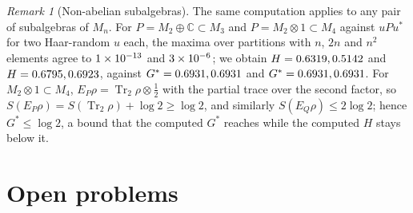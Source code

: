 \documentclass[11pt]{article}
\DeclareMathOperator{\Tr}{Tr}
\newcommand{\C}{\mathbb{C}}
\theoremstyle{plain}
\theoremstyle{definition}
\theoremstyle{remark}
\newtheorem{remark}[theorem]{Remark}
\begin{document}
\begin{remark}[Non-abelian subalgebras]\label{rem:nonab}
The same computation applies to any pair of subalgebras of $M_n$. For $P=M_2\oplus\C\subset M_3$ and $P=M_2\otimes1\subset M_4$
against $uPu^*$ for two Haar-random $u$ each, the maxima over partitions with $n$, $2n$ and $n^2$ elements agree to
$1\times10^{-13}$ and $3\times10^{-6}$; we obtain $H=0.6319, 0.5142$ and $H=0.6795, 0.6923$, against $G^*=0.6931, 0.6931$ and
$G^*=0.6931, 0.6931$. For $M_2\otimes1\subset M_4$, $E_P\rho=\Tr_2\rho\otimes\frac12$ with the partial trace over the second factor, so
$S(E_P\rho)=S(\Tr_2\rho)+\log2\ge\log2$, and similarly $S(E_Q\rho)\le2\log2$; hence $G^*\le\log2$, a bound that the computed $G^*$
reaches while the computed $H$ stays below it.
\end{remark}

\section{Open problems}\label{sec:open}
\end{document}
